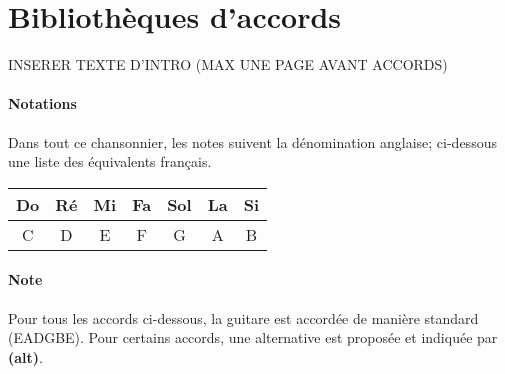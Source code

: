 \documentclass[a5paper]{scrbook}
\begin{document}
\section{Bibliothèques d'accords}
INSERER TEXTE D'INTRO (MAX UNE PAGE AVANT ACCORDS)
\paragraph{Notations} Dans tout ce chansonnier, les notes suivent la dénomination anglaise; ci-dessous une liste des équivalents français.
\newline\newline
\begin{tabular}{||c||c||c||c||c||c||c||}
    \hline
    Do & Ré & Mi & Fa & Sol & La & Si\\
    \hline
    C & D & E & F & G & A & B\\
    \hline
\end{tabular}
\paragraph{Note} Pour tous les accords ci-dessous, la guitare est accordée de manière standard (EADGBE).\newline
Pour certains accords, une alternative est proposée et indiquée par \textbf{(alt)}.

\newpage
\usebox{\A}
\usebox{\Aalt}
\usebox{\Am}
\usebox{\Amalt}
\usebox{\Afive}
\usebox{\Aseven}
\usebox{\Asevenalt}
\usebox{\Amajseven}
\usebox{\Amajsevenalt}
\usebox{\Amseven}
\usebox{\Amsevenalt}
\usebox{\Asusfour}
\usebox{\Asusfouralt}
\usebox{\Aaddnine}
\usebox{\Asustwo}
\usebox{\Asevensusfour}
\usebox{\Asevensusfouralt}
\usebox{\Asevensharpnine}
\usebox{\Anine}

\newpage
\usebox{\B}
\usebox{\Bm}
\usebox{\Bfive}
\usebox{\Bseven}
\usebox{\Bsevenalt}
\usebox{\Bmajseven}
\usebox{\Bmseven}
\usebox{\Bsusfour}
\usebox{\Baddnine}
\usebox{\Bsustwo}
\usebox{\Bsevensusfour}
\usebox{\Bsevensharpnine}
\usebox{\Bnine}

\newpage
\usebox{\C}
\usebox{\Calt}
\usebox{\Cm}
\usebox{\Cfive}
\usebox{\Cseven}
\usebox{\Csevenalt}
\usebox{\Cmajseven}
\usebox{\Cmajsevenalt}
\usebox{\Cmseven}
\usebox{\Csusfour}
\usebox{\Caddnine}
\usebox{\Caddninealt}
\usebox{\Csustwo}
\usebox{\Csevensusfour}
\usebox{\Csevensharpnine}
\usebox{\Cnine}

\newpage
\usebox{\D}
\usebox{\Dalt}
\usebox{\Dm}
\usebox{\Dmalt}
\usebox{\Dfive}
\usebox{\Dseven}
\usebox{\Dsevenalt}
\usebox{\Dmajseven}
\usebox{\Dmajsevenalt}
\usebox{\Dmseven}
\usebox{\Dmsevenalt}
\usebox{\Dsusfour}
\usebox{\Dsusfouralt}
\usebox{\Daddnine}
\usebox{\Dsustwo}
\usebox{\Dsustwoalt}
\usebox{\Dsevensusfour}
\usebox{\Dsevensusfouralt}
\usebox{\Dsevensharpnine}
\usebox{\Dnine}
\end{document}

